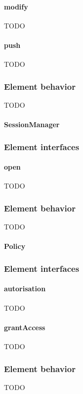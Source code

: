 \documentclass[a4paper,10pt]{paper}
\begin{document}
\paragraph{modify}
TODO

\paragraph{push}
TODO

\subsubsection{Element behavior}
TODO

\paragraph{SessionManager}

\subsubsection{Element interfaces} 

\paragraph{open}
TODO

\subsubsection{Element behavior}
TODO

\paragraph{Policy}

\subsubsection{Element interfaces} 

\paragraph{autorisation}
TODO

\paragraph{grantAccess}
TODO

\subsubsection{Element behavior}
TODO
\end{document}

